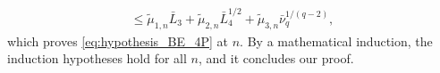 \documentclass[aos]{imsart}
\begin{document}
\begin{appendix}
\begin{equation*}
\begin{aligned}
    \leq \tilde\mu_{1,n} \bar{L}_{3}
    + \tilde\mu_{2,n} \bar{L}_{4}^{1/2}
    + \tilde\mu_{3,n} \bar\nu_{q}^{1/(q-2)},
\end{aligned}
\end{equation*}
which proves \eqref{eq:hypothesis_BE_4P} at $n$. By a mathematical induction, the induction hypotheses hold for all $n$, and it concludes our proof.
%

\end{appendix}
\end{document}
